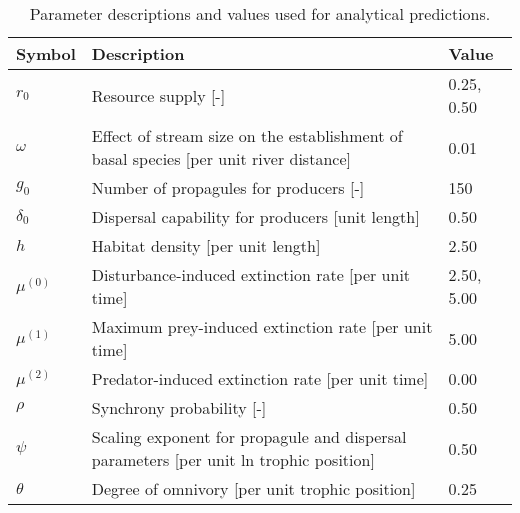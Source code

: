 \begin{table}[ht]
\centering
\caption{Parameter descriptions and values used for analytical predictions.} 
\label{tab:parms}
\begingroup\small
\begin{tabularx}{\textwidth}{lll}
  \hline
Symbol & Description & Value \\ 
  \hline
$r_0$ & Resource supply [-] & 0.25, 0.50 \\ 
  $\omega$ & Effect of stream size on the establishment of basal species [per unit river distance] & 0.01 \\ 
  $g_0$ & Number of propagules for producers [-] & 150 \\ 
  $\delta_0$ & Dispersal capability for producers [unit length] & 0.50 \\ 
  $h$ & Habitat density [per unit length] & 2.50 \\ 
  $\mu^{(0)}$ & Disturbance-induced extinction rate [per unit time] & 2.50, 5.00 \\ 
  $\mu^{(1)}$ & Maximum prey-induced extinction rate [per unit time] & 5.00 \\ 
  $\mu^{(2)}$ & Predator-induced extinction rate [per unit time] & 0.00 \\ 
  $\rho$ & Synchrony probability [-] & 0.50 \\ 
  $\psi$ & Scaling exponent for propagule and dispersal parameters [per unit ln trophic position] & 0.50 \\ 
  $\theta$ & Degree of omnivory [per unit trophic position] & 0.25 \\ 
   \hline
\end{tabularx}
\endgroup
\end{table}
